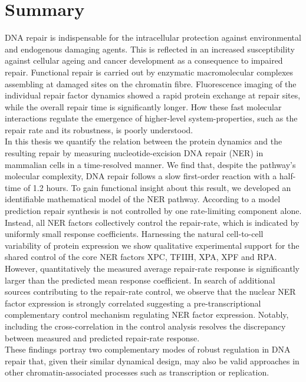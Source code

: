\chapter*{Summary}





DNA repair is indispensable for the intracellular protection against environmental and endogenous damaging agents.
This is reflected in an increased susceptibility against cellular ageing and cancer development as a consequence to impaired repair. Functional repair is carried out by enzymatic macromolecular complexes assembling at damaged sites on the chromatin fibre. Fluorescence imaging of the individual repair factor dynamics showed a rapid protein exchange at repair sites, while the overall repair time is significantly longer. How these fast molecular interactions regulate the emergence of higher-level system-properties, such as the repair rate and its robustness, is poorly understood.\\ 
In this thesis we quantify the relation between the protein dynamics and the resulting repair by measuring nucleotide-excision DNA repair (NER) in mammalian cells in a time-resolved manner. We find that, despite the pathway's molecular complexity, DNA repair follows a slow first-order reaction with a half-time of 1.2 hours. To gain functional insight about this result, we developed an identifiable mathematical model of the NER pathway. According to a model prediction repair synthesis is not controlled by one rate-limiting component alone. Instead, all NER factors collectively control the repair-rate, which is indicated by uniformly small response coefficients. Harnessing the natural cell-to-cell variability of protein expression we show qualitative experimental support for the shared control of the core NER factors XPC, TFIIH, XPA, XPF and RPA. However, quantitatively the measured average repair-rate response is significantly larger than the predicted mean response coefficient. In search of additional sources contributing to the repair-rate control, we observe that the nuclear NER factor expression is strongly correlated suggesting a pre-transcriptional complementary control mechanism regulating NER factor expression. Notably, including the cross-correlation in the control analysis resolves the discrepancy between measured and predicted repair-rate response.\\  
These findings portray two complementary modes of robust regulation in DNA repair that, given their similar dynamical design, may also be valid approaches in other chromatin-associated processes such as transcription or replication.  




      
 
%



%
